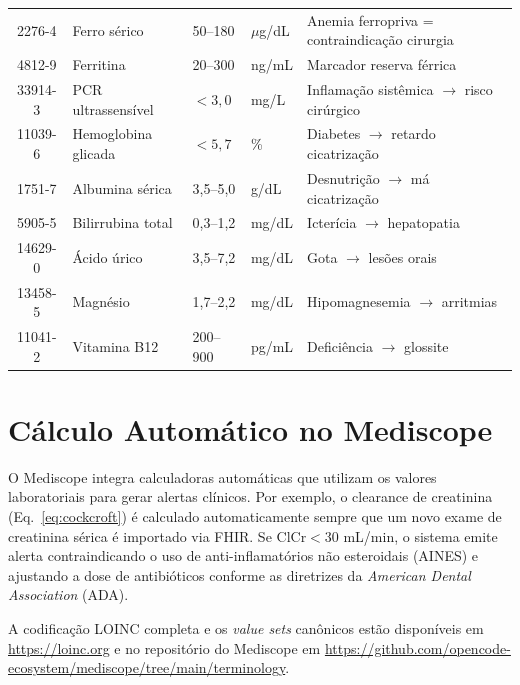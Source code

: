\begin{longtable}[c]{cL{0.20\textwidth}L{0.16\textwidth}L{0.12\textwidth}L{0.25\textwidth}}
2276-4 & Ferro sérico & 50--180 & $\mu$g/dL & Anemia ferropriva = contraindicação cirurgia \\
4812-9 & Ferritina & 20--300 & ng/mL & Marcador reserva férrica \\
33914-3 & PCR ultrassensível & $<3{,}0$ & mg/L & Inflamação sistêmica $\to$ risco cirúrgico \\
11039-6 & Hemoglobina glicada & $<5{,}7$ & \% & Diabetes $\to$ retardo cicatrização \\
1751-7 & Albumina sérica & 3{,}5--5{,}0 & g/dL & Desnutrição $\to$ má cicatrização \\
5905-5 & Bilirrubina total & 0{,}3--1{,}2 & mg/dL & Icterícia $\to$ hepatopatia \\
14629-0 & Ácido úrico & 3{,}5--7{,}2 & mg/dL & Gota $\to$ lesões orais \\
13458-5 & Magnésio & 1{,}7--2{,}2 & mg/dL & Hipomagnesemia $\to$ arritmias \\
11041-2 & Vitamina B12 & 200--900 & pg/mL & Deficiência $\to$ glossite \\
\bottomrule
\end{longtable}

\section{Cálculo Automático no Mediscope}

O Mediscope integra calculadoras automáticas que utilizam os valores laboratoriais para gerar alertas clínicos. Por exemplo, o clearance de creatinina (Eq.~\ref{eq:cockcroft}) é calculado automaticamente sempre que um novo exame de creatinina sérica é importado via FHIR. Se $\text{ClCr} < 30$ mL/min, o sistema emite alerta contraindicando o uso de anti-inflamatórios não esteroidais (AINES) e ajustando a dose de antibióticos conforme as diretrizes da \textit{American Dental Association} (ADA).

A codificação LOINC completa e os \textit{value sets} canônicos estão disponíveis em \url{https://loinc.org} e no repositório do Mediscope em \url{https://github.com/opencode-ecosystem/mediscope/tree/main/terminology}.
